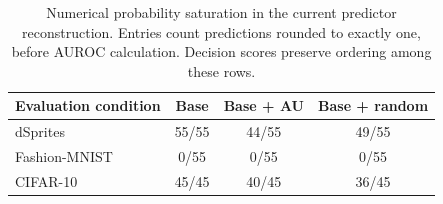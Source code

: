 \begin{table}[H]
\caption{Numerical probability saturation in the current predictor reconstruction. Entries count predictions rounded to exactly one, before AUROC calculation. Decision scores preserve ordering among these rows.}\label{tab:saturation}
\small
\setlength{\tabcolsep}{3.5pt}
\begin{tabular*}{\textwidth}{@{\extracolsep{\fill}}lccc@{}}
\toprule
Evaluation condition & Base & Base + AU & Base + random \\
\midrule
dSprites & 55/55 & 44/55 & 49/55 \\
Fashion-MNIST & 0/55 & 0/55 & 0/55 \\
CIFAR-10 & 45/45 & 40/45 & 36/45 \\
\bottomrule
\end{tabular*}
\end{table}
